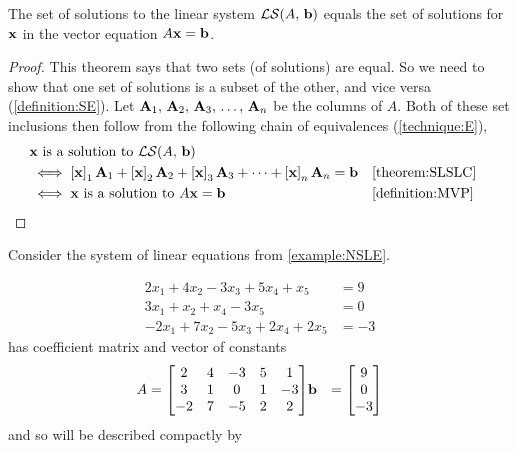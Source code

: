 \documentclass{ximera}
\begin{document}
\begin{theorem}
\label{theorem:SLEMM}

The set of solutions to the linear system $\mathcal{LS}\!\left(A,\,\mathbf{b}\right)$
equals the set of solutions for $\mathbf{x}$ in the vector equation
$A\mathbf{x}=\mathbf{b}$.

\begin{proof}
  This theorem says that two sets (of solutions) are equal.  So we
  need to show that one set of solutions is a subset of the other, and
  vice versa (\ref{definition:SE}).  Let $\mathbf{A}_{1},\,\mathbf{A}_{2},\,\mathbf{A}_{3},\,\ldots,\,\mathbf{A}_{n}$ be the
  columns of $A$.  Both of these set inclusions then follow from the
  following chain of equivalences (\ref{technique:E}),
  \begin{align*}
    &\mathbf{x}\text{ is a solution to }\mathcal{LS}\!\left(A,\,\mathbf{b}\right)\\
    &\iff
      \left\lbrack\mathbf{x}\right\rbrack_{1}\mathbf{A}_1+
      \left\lbrack\mathbf{x}\right\rbrack_{2}\mathbf{A}_2+
      \left\lbrack\mathbf{x}\right\rbrack_{3}\mathbf{A}_3+
      \cdots+
      \left\lbrack\mathbf{x}\right\rbrack_{n}\mathbf{A}_n
      =\mathbf{b}&&\ref{theorem:SLSLC}\\
    &\iff
      \mathbf{x}\text{ is a solution to }A\mathbf{x}=\mathbf{b}&&\ref{definition:MVP}
  \end{align*}

\end{proof}
\end{theorem}

\begin{example}
  Consider the system of linear equations from \ref{example:NSLE}.

  \begin{align*}
    2x_1+4x_2-3x_3+5x_4+x_5&=9\\
    3x_1+x_2+x_4-3x_5&=0\\
    -2x_1+7x_2-5x_3+2x_4+2x_5&=-3
  \end{align*}
  has coefficient matrix and vector of constants
  \begin{align*}
    A =
    \begin{bmatrix}
      2 & 4 & -3 & 5 & 1\\
      3 & 1 & 0 & 1 & -3\\
      -2 & 7 & -5 & 2 & 2
    \end{bmatrix}
        &\mathbf{b}&=\begin{bmatrix}9\\0\\-3\end{bmatrix}
  \end{align*}
  and so will be described compactly by 
  \begin{multipleChoice}
  \end{multipleChoice}

\end{example}
\end{document}
